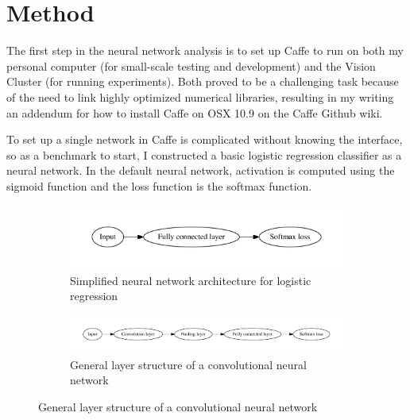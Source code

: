 \documentclass[10pt]{article}
\begin{document}


\section{Method}

The first step in the neural network analysis is to set up Caffe to run on both my personal computer (for small-scale testing and development) and the Vision Cluster (for running experiments). Both proved to be a challenging task because of the need to link highly optimized numerical libraries, resulting in my writing an addendum for how to install Caffe on OSX 10.9 on the Caffe Github wiki.

To set up a single network in Caffe is complicated without knowing the interface, so as a benchmark to start, I constructed a basic logistic regression classifier as a neural network. In the default neural network, activation is computed using the sigmoid function and the loss function is the softmax function.

\begin{figure}[!ht]
\centering
\begin{subfigure}[b]{0.5\textwidth}
	\centering
	\includegraphics[width=\textwidth]{logreg.pdf}
	\caption{Simplified neural network architecture for logistic regression}
	\label{fig:logregnn}
\end{subfigure}
\begin{subfigure}[b]{0.8\textwidth}
	\centering
	\includegraphics[width=\textwidth]{generalcnn.pdf}
	\caption{General layer structure of a convolutional neural network}
	\label{fig:generalcnn}
\end{subfigure}
\end{figure}
\end{document}
